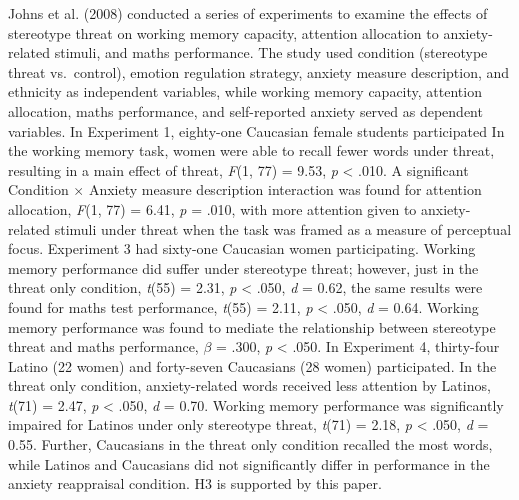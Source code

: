 \documentclass[
  stu, a4paper, 12pt,mask,floatsintext]{apa7}
\begin{document}
Johns et al. (2008) conducted a series of experiments to examine the effects of stereotype threat on working memory capacity, attention allocation to anxiety-related stimuli, and maths performance.
The study used condition (stereotype threat vs.~control), emotion regulation strategy, anxiety measure description, and ethnicity as independent variables, while working memory capacity, attention allocation, maths performance, and self-reported anxiety served as dependent variables.
In Experiment 1, eighty-one Caucasian female students participated
In the working memory task, women were able to recall fewer words under threat, resulting in a main effect of threat, \emph{F}(1, 77) = 9.53, \emph{p} \textless{} .010.
A significant Condition \(\times\) Anxiety measure description interaction was found for attention allocation, \emph{F}(1, 77) = 6.41, \emph{p} = .010, with more attention given to anxiety-related stimuli under threat when the task was framed as a measure of perceptual focus.
Experiment 3 had sixty-one Caucasian women participating.
Working memory performance did suffer under stereotype threat; however, just in the threat only condition, \emph{t}(55) = 2.31, \emph{p} \textless{} .050, \emph{d} = 0.62, the same results were found for maths test performance, \emph{t}(55) = 2.11, \emph{p} \textless{} .050, \emph{d} = 0.64.
Working memory performance was found to mediate the relationship between stereotype threat and maths performance, \(\beta\) = .300, \emph{p} \textless{} .050.
In Experiment 4, thirty-four Latino (22 women) and forty-seven Caucasians (28 women) participated.
In the threat only condition, anxiety-related words received less attention by Latinos, \emph{t}(71) = 2.47, \emph{p} \textless{} .050, \emph{d} = 0.70.
Working memory performance was significantly impaired for Latinos under only stereotype threat, \emph{t}(71) = 2.18, \emph{p} \textless{} .050, \emph{d} = 0.55.
Further, Caucasians in the threat only condition recalled the most words, while Latinos and Caucasians did not significantly differ in performance in the anxiety reappraisal condition.
H3 is supported by this paper.
\end{document}
